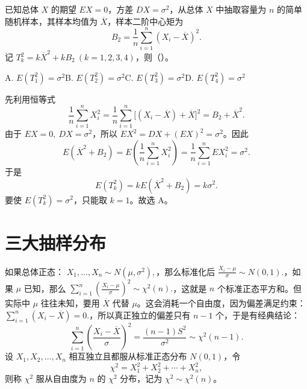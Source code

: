 \documentclass[lang=cn,11pt]{elegantbook}
\begin{document}
\begin{exercise}\label{exer:6-sk-sq}
已知总体 \(X\) 的期望 \(EX = 0\)，方差 \(DX = \sigma^2\)，从总体 \(X\) 中抽取容量为 \(n\) 的简单随机样本，其样本均值为 \(\overline{X}\)，样本二阶中心矩为
\[
B_2=\frac1n\sum_{i=1}^n(X_i-\overline X)^2.
\]
记 \(T_k^2=k\overline{X}^2+kB_2\ (k=1,2,3,4)\)，则（\quad）。\par
A. \(E(T_1^2) = \sigma^2\)\quad B. \(E(T_2^2) = \sigma^2\)\quad C. \(E(T_3^2) = \sigma^2\)\quad D. \(E(T_4^2) = \sigma^2\)
\end{exercise}

\begin{solution}
先利用恒等式
\[
\frac1n\sum_{i=1}^nX_i^2
=\frac1n\sum_{i=1}^n\bigl[(X_i-\overline X)+\overline X\bigr]^2
=B_2+\overline X^2.
\]
由于 \(EX=0,\ DX=\sigma^2\)，所以 \(EX^2=DX+(EX)^2=\sigma^2\)。因此
\[
E(\overline X^2+B_2)
=E\left(\frac1n\sum_{i=1}^nX_i^2\right)
=\frac1n\sum_{i=1}^nEX_i^2
=\sigma^2.
\]
于是
\[
E(T_k^2)=kE(\overline X^2+B_2)=k\sigma^2.
\]
要使 \(E(T_k^2)=\sigma^2\)，只能取 \(k=1\)。故选 A。
\end{solution}


\section{三大抽样分布}


\begin{definition} \label{def:chi2}
如果总体正态：
\(
X_1,\dots,X_n\sim N(\mu,\sigma^2),
\)，那么标准化后
\(
\frac{X_i-\mu}{\sigma}\sim N(0,1).
\)，如果 \(\mu\) 已知，那么
\(
\sum_{i=1}^n\left(\frac{X_i-\mu}{\sigma}\right)^2\sim \chi^2(n).
\)，这就是 \(n\) 个标准正态平方和。但实际中 \(\mu\) 往往未知，要用 \(\overline X\) 代替 \(\mu\)。这会消耗一个自由度，因为偏差满足约束：
\(
\sum_{i=1}^n (X_i-\overline X)=0.
\)，所以真正独立的偏差只有 \(n-1\) 个，于是有经典结论：
\[
\sum_{i=1}^n(\frac{X_i-\overline X}{\sigma})^2=\frac{(n-1)S^2}{\sigma^2}\sim \chi^2(n-1).
\]
设 \(X_1, X_2, \dots, X_n\) 相互独立且都服从标准正态分布 \(N(0,1)\)，令
\[
\chi^2 = X_1^2 + X_2^2 + \cdots + X_n^2,
\]
则称 \(\chi^2\) 服从自由度为 \(n\) 的 \(\chi^2\) 分布，记为 \(\chi^2 \sim \chi^2(n)\)。
\end{definition}
\end{document}
